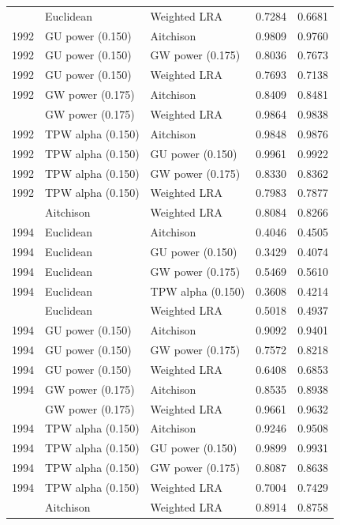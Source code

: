 \begin{longtable}[t]{rllrr}
\addlinespace
1992 & Euclidean & Weighted LRA & 0.7284 & 0.6681\\
1992 & GU power (0.150) & Aitchison & 0.9809 & 0.9760\\
1992 & GU power (0.150) & GW power (0.175) & 0.8036 & 0.7673\\
1992 & GU power (0.150) & Weighted LRA & 0.7693 & 0.7138\\
1992 & GW power (0.175) & Aitchison & 0.8409 & 0.8481\\
\addlinespace
1992 & GW power (0.175) & Weighted LRA & 0.9864 & 0.9838\\
1992 & TPW alpha (0.150) & Aitchison & 0.9848 & 0.9876\\
1992 & TPW alpha (0.150) & GU power (0.150) & 0.9961 & 0.9922\\
1992 & TPW alpha (0.150) & GW power (0.175) & 0.8330 & 0.8362\\
1992 & TPW alpha (0.150) & Weighted LRA & 0.7983 & 0.7877\\
\addlinespace
1994 & Aitchison & Weighted LRA & 0.8084 & 0.8266\\
1994 & Euclidean & Aitchison & 0.4046 & 0.4505\\
1994 & Euclidean & GU power (0.150) & 0.3429 & 0.4074\\
1994 & Euclidean & GW power (0.175) & 0.5469 & 0.5610\\
1994 & Euclidean & TPW alpha (0.150) & 0.3608 & 0.4214\\
\addlinespace
1994 & Euclidean & Weighted LRA & 0.5018 & 0.4937\\
1994 & GU power (0.150) & Aitchison & 0.9092 & 0.9401\\
1994 & GU power (0.150) & GW power (0.175) & 0.7572 & 0.8218\\
1994 & GU power (0.150) & Weighted LRA & 0.6408 & 0.6853\\
1994 & GW power (0.175) & Aitchison & 0.8535 & 0.8938\\
\addlinespace
1994 & GW power (0.175) & Weighted LRA & 0.9661 & 0.9632\\
1994 & TPW alpha (0.150) & Aitchison & 0.9246 & 0.9508\\
1994 & TPW alpha (0.150) & GU power (0.150) & 0.9899 & 0.9931\\
1994 & TPW alpha (0.150) & GW power (0.175) & 0.8087 & 0.8638\\
1994 & TPW alpha (0.150) & Weighted LRA & 0.7004 & 0.7429\\
\addlinespace
1996 & Aitchison & Weighted LRA & 0.8914 & 0.8758\\

\end{longtable}
